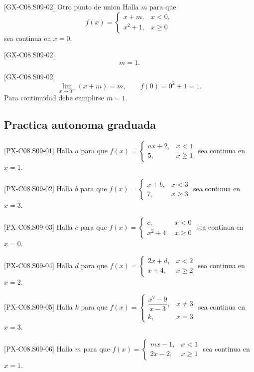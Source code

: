 \begin{guidedexercise}{[GX-C08.S09-02] Otro punto de union}
Halla \(m\) para que
\[
f(x)=
\begin{cases}
x+m,& x<0,\\
x^2+1,& x\geq 0
\end{cases}
\]
sea continua en \(x=0\).
\end{guidedexercise}

\begin{shortanswer}{[GX-C08.S09-02]}
\[
m=1.
\]
\end{shortanswer}

\begin{fullsolution}{[GX-C08.S09-02]}
\[
\lim_{x\to 0^-}(x+m)=m,\qquad f(0)=0^2+1=1.
\]
Para continuidad debe cumplirse \(m=1\).
\end{fullsolution}

\subsection*{Practica autonoma graduada}
\begin{exercise}{[PX-C08.S09-01] Halla \(a\) para que \(f(x)=\begin{cases}ax+2,&x<1\\5,&x\geq1\end{cases}\) sea continua en \(x=1\).}
\end{exercise}
\begin{exercise}{[PX-C08.S09-02] Halla \(b\) para que \(f(x)=\begin{cases}x+b,&x<3\\7,&x\geq3\end{cases}\) sea continua en \(x=3\).}
\end{exercise}
\begin{exercise}{[PX-C08.S09-03] Halla \(c\) para que \(f(x)=\begin{cases}c,&x<0\\x^2+4,&x\geq0\end{cases}\) sea continua en \(x=0\).}
\end{exercise}
\begin{exercise}{[PX-C08.S09-04] Halla \(d\) para que \(f(x)=\begin{cases}2x+d,&x<2\\x+4,&x\geq2\end{cases}\) sea continua en \(x=2\).}
\end{exercise}
\begin{exercise}{[PX-C08.S09-05] Halla \(k\) para que \(f(x)=\begin{cases}\dfrac{x^2-9}{x-3},&x\neq3\\k,&x=3\end{cases}\) sea continua en \(x=3\).}
\end{exercise}
\begin{exercise}{[PX-C08.S09-06] Halla \(m\) para que \(f(x)=\begin{cases}mx-1,&x<1\\2x-2,&x\geq1\end{cases}\) sea continua en \(x=1\).}
\end{exercise}

